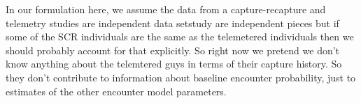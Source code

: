 In our formulation here, 
we assume the data from a capture-recapture and telemetry studies are
independent data setstudy 
are independent pieces but if some of the SCR
individuals are the same as the telemetered individuals then we should
probably account for that explicitly. So right now we pretend we don't
know anything about the telemtered guys in terms of their capture
history. So they don't contribute to information about baseline
encounter probability, just to estimates of the other encounter model
parameters. 


























